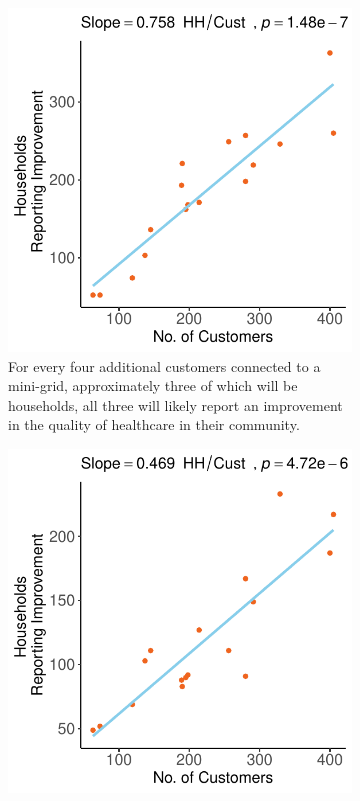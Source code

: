 \begin{figure}[t]
	\centering
	\begin{subfigure}[t]{0.48\textwidth}
		\centering
		\includegraphics[width=\textwidth]{images/better_access_health_minigrid_regression_community.pdf}
		\caption{For every four additional customers connected to a mini-grid, approximately three of which will be households, all three will likely report an improvement in the quality of healthcare in their community.}
		\label{fig:better_healthcare}
	\end{subfigure}
	\hfill
	\begin{subfigure}[t]{0.48\textwidth}
		\centering
		\includegraphics[width=\textwidth]{images/minigrid_access_life_improvement_regression_community.pdf}

\end{subfigure}
\end{figure}
